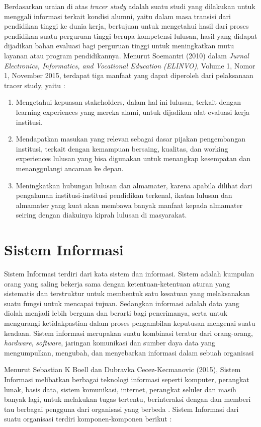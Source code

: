 Berdasarkan uraian di atas \textit{tracer study} adalah suatu studi yang dilakukan untuk menggali informasi terkait kondisi alumni, yaitu dalam masa transisi dari pendidikan tinggi ke dunia kerja, bertujuan untuk mengetahui hasil dari proses pendidikan suatu perguruan tinggi berupa kompetensi lulusan, hasil yang didapat dijadikan bahan evaluasi bagi perguruan tinggi untuk meningkatkan mutu layanan atau program pendidikannya. Menurut Soemantri (2010) dalam \textit{Jurnal Electronics, Informatics, and Vocational Education (ELINVO)}, Volume 1, Nomor 1, November 2015, terdapat tiga manfaat yang dapat diperoleh dari pelaksanaan tracer study, yaitu \cite{Nuryake} :
\begin{enumerate}
	\item Mengetahui kepuasan stakeholders, dalam hal ini lulusan, terkait dengan learning experiences yang mereka alami, untuk dijadikan alat evaluasi kerja institusi.
	\item Mendapatkan masukan yang relevan sebagai dasar pijakan pengembangan institusi, terkait dengan kemampuan bersaing, kualitas, dan working experiences lulusan yang bisa digunakan untuk menangkap kesempatan dan menanggulangi ancaman ke depan. 
	\item Meningkatkan hubungan lulusan dan almamater, karena apabila dilihat dari pengalaman institusi-institusi pendidikan terkenal, ikatan lulusan dan almamater yang kuat akan membawa banyak manfaat kepada almamater seiring dengan diakuinya kiprah lulusan di masyarakat. 
\end{enumerate}
	
\section{Sistem Informasi}
Sistem Informasi terdiri dari kata sistem dan informasi. Sistem adalah kumpulan orang yang saling bekerja sama dengan ketentuan-ketentuan aturan yang sistematis dan terstruktur untuk membentuk satu kesatuan yang melaksanakan suatu fungsi untuk mencapai tujuan. Sedangkan informasi adalah data yang diolah menjadi lebih berguna dan berarti bagi penerimanya, serta untuk mengurangi ketidakpastian dalam proses pengambilan keputusan mengenai suatu keadaan. Sistem informasi merupakan suatu kombinasi teratur dari orang-orang, \textit{hardware}, \textit{software}, jaringan komunikasi dan sumber daya data yang mengumpulkan, mengubah, dan menyebarkan informasi dalam sebuah organisasi \cite{Elisabet}

Menurut Sebastian K Boell dan Dubravka Cecez-Kecmanovic (2015), Sistem Informasi melibatkan berbagai teknologi informasi seperti komputer, perangkat lunak, basis data, sistem komunikasi, internet, perangkat seluler dan masih banyak lagi, untuk melakukan tugas tertentu, berinteraksi dengan dan memberi tau berbagai pengguna dari organisasi yang berbeda \cite{Sebastian}. Sistem Informasi dari suatu organisasi terdiri komponen-komponen berikut \cite{Muslihudin} :


